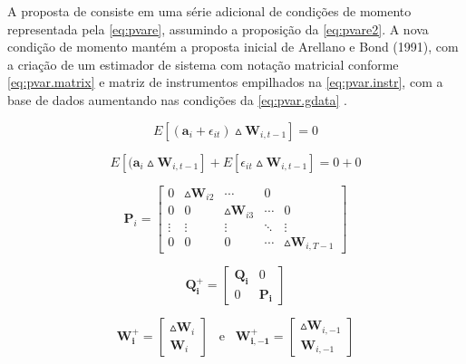 \documentclass[
  12pt,
  12pt,
  openright,
  oneside,
  a4paper,
  chapter=TITLE,
  section=TITLE,
  subsection=TITLE,
  subsubsection=TITLE,
  portugues,
  sumario=tradicional]{abntex2}
\begin{document}
A proposta de \textcite{blundelbond:1998} consiste em uma série adicional de condições de momento representada pela \autoref{eq:pvare}, assumindo a proposição da \autoref{eq:pvare2}. A nova condição de momento mantém a proposta inicial de Arellano e Bond (1991), com a criação de um estimador de sistema com notação matricial conforme \autoref{eq:pvar.matrix} e matriz de instrumentos empilhados na \autoref{eq:pvar.instr}, com a base de dados aumentando nas condições da \autoref{eq:pvar.gdata} \cite{sigmund:2008}.

\begin{equation}\label{eq:pvare}
E[(\mathbf{a}_{i} + \epsilon_{it}) \vartriangle\mathbf{W}_{i, t-1}] = 0
\end{equation}

\begin{equation}\label{eq:pvare2}
E[(\mathbf{a}_{i} \vartriangle\mathbf{W}_{i, t-1}]  +  E[\epsilon_{it}\vartriangle\mathbf{W}_{i, t-1}] = 0 + 0
\end{equation}

\begin{equation}\label{eq:pvar.matrix}
\mathbf{P}_{i} = \left[\begin{array}{ccccc}
0 & \vartriangle\mathbf{W}_{i2} & \cdots & 0 \\
0 & 0 &  \vartriangle\mathbf{W}_{i3} & \cdots & 0 \\
\vdots & \vdots & \vdots & \ddots & \vdots \\
0 & 0 & 0 & \cdots & \vartriangle\mathbf{W}_{i, T-1}
\end{array}\right]
\end{equation}

\begin{equation}\label{eq:pvar.instr}
\mathbf{Q^{+}_{i}} = \left[\begin{array}{cc}
\mathbf{Q_{i}} & 0 \\
0 & \mathbf{P_{i}}
\end{array}\right]
\end{equation}

\begin{equation}\label{eq:pvar.gdata}
\mathbf{W^{+}_{i}} = \left[\begin{array}{c}
\vartriangle\mathbf{W}_{i}  \\
\mathbf{W}_{i} 
\end{array}\right]\hspace{10pt}\text{e}\hspace{10pt}\mathbf{W^{+}_{i, -1}} = \left[\begin{array}{c}
\vartriangle\mathbf{W}_{i,-1}  \\
\mathbf{W}_{i,-1} 
\end{array}\right]
\end{equation}
\end{document}
